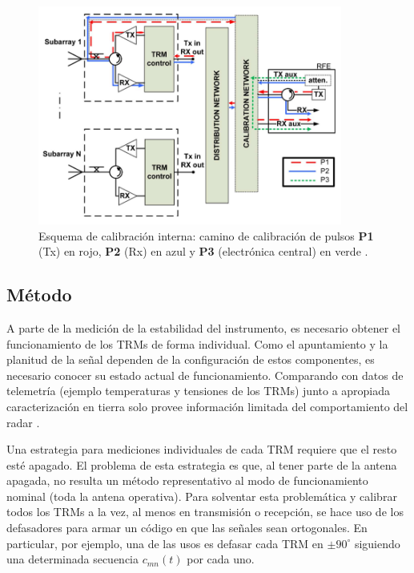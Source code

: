 \begin{figure}[H]
 \centering
 \includegraphics[width=10cm]{gfx/classic_cal_scheme.png}
 \caption{Esquema de calibración interna: camino de calibración de pulsos \textbf{P1} (Tx) en rojo, \textbf{P2} (Rx) en azul 
 y \textbf{P3} (electrónica central) en verde \cite{Makhoul2012}.}
 \label{fig:classic_cal_scheme}
\end{figure}

\subsection{Método}

A parte de la medición de la estabilidad del instrumento, es necesario obtener el funcionamiento de los TRMs de forma 
individual. Como el apuntamiento y la planitud de la señal dependen de la configuración de estos componentes, es necesario 
conocer su estado actual de funcionamiento. Comparando con datos de telemetría (ejemplo temperaturas y tensiones de los 
TRMs) junto a apropiada caracterización en tierra solo provee información limitada del comportamiento del radar \cite{Br2007}.

Una estrategia para mediciones individuales de cada TRM requiere que el resto esté apagado. El problema de esta estrategia 
es que, al tener parte de la antena apagada, no resulta un método representativo al modo de funcionamiento nominal (toda la 
antena operativa). Para solventar esta problemática y calibrar todos los TRMs a la vez, al menos en transmisión o recepción,
se hace uso de los defasadores para armar un código en que las señales sean ortogonales. En particular, por ejemplo, una de
las usos es defasar cada TRM en $\pm90^{\circ}$ siguiendo una determinada secuencia $c_{mn}(t)$ por cada uno.

